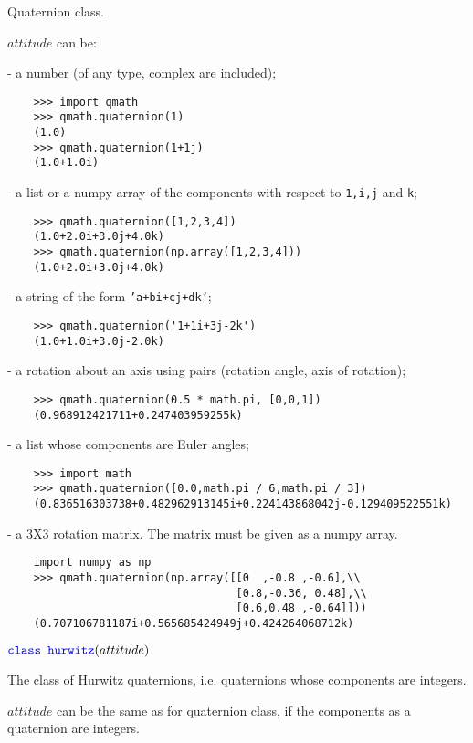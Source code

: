 \documentclass[11pt]{paper}
\begin{document}
\noindent Quaternion class. 

\noindent $attitude$ can be:

\noindent - a number (of any type, complex are included);
\begin{verbatim}
    >>> import qmath
    >>> qmath.quaternion(1)
    (1.0)
    >>> qmath.quaternion(1+1j)
    (1.0+1.0i)
\end{verbatim}
\noindent - a list or a numpy array of the components with respect to \texttt{1,i,j} and \texttt{k}; 
\begin{verbatim}
    >>> qmath.quaternion([1,2,3,4])
    (1.0+2.0i+3.0j+4.0k)
    >>> qmath.quaternion(np.array([1,2,3,4]))
    (1.0+2.0i+3.0j+4.0k)
\end{verbatim}
\noindent - a string of the form \texttt{'a+bi+cj+dk'};
\begin{verbatim}
    >>> qmath.quaternion('1+1i+3j-2k')
    (1.0+1.0i+3.0j-2.0k)
\end{verbatim}
\noindent - a rotation about an axis using pairs (rotation angle, axis of rotation);
\begin{verbatim}
    >>> qmath.quaternion(0.5 * math.pi, [0,0,1])
    (0.968912421711+0.247403959255k)
\end{verbatim}


\noindent - a list whose components are Euler angles;
\begin{verbatim}
    >>> import math
    >>> qmath.quaternion([0.0,math.pi / 6,math.pi / 3])
    (0.836516303738+0.482962913145i+0.224143868042j-0.129409522551k)
\end{verbatim}
\noindent - a 3X3 rotation matrix. The matrix must be given as a numpy array.
\begin{verbatim}
    import numpy as np
    >>> qmath.quaternion(np.array([[0  ,-0.8 ,-0.6],\\
                                   [0.8,-0.36, 0.48],\\
                                   [0.6,0.48 ,-0.64]]))
    (0.707106781187i+0.565685424949j+0.424264068712k)
\end{verbatim}        

\medskip

\noindent $\textcolor{blue}{\texttt{class hurwitz}}(attitude)$

\noindent The class of Hurwitz quaternions, i.e. quaternions whose components are integers. 

\noindent $attitude$ can be the same as for quaternion class, if the components as a quaternion are integers.
\end{document}
